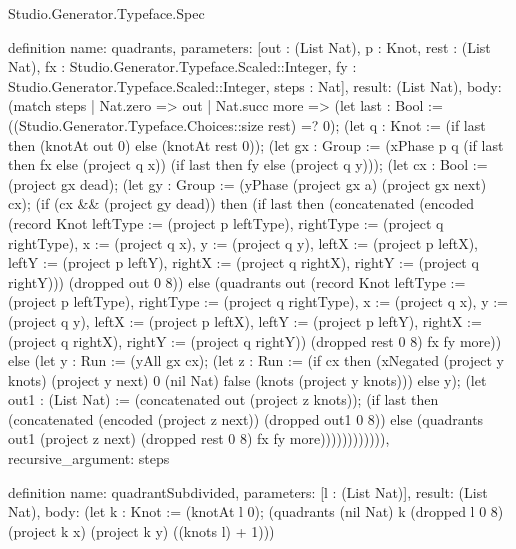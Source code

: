 \begin{lexlean}{Studio.Generator.Typeface.Spec}
\begin{semanticmodule}
definition{
  name: quadrants,
  parameters: [out : (List Nat), p : Knot, rest : (List Nat), fx : Studio.Generator.Typeface.Scaled::Integer, fy : Studio.Generator.Typeface.Scaled::Integer, steps : Nat],
  result: (List Nat),
  body: (match steps
    | Nat.zero => out
    | Nat.succ more => (let last : Bool := ((Studio.Generator.Typeface.Choices::size rest) =? 0); (let q : Knot := (if last then (knotAt out 0) else (knotAt rest 0)); (let gx : Group := (xPhase p q (if last then fx else (project q x)) (if last then fy else (project q y))); (let cx : Bool := (project gx dead); (let gy : Group := (yPhase (project gx a) (project gx next) cx); (if (cx && (project gy dead)) then (if last then (concatenated (encoded (record Knot {leftType := (project p leftType), rightType := (project q rightType), x := (project q x), y := (project q y), leftX := (project p leftX), leftY := (project p leftY), rightX := (project q rightX), rightY := (project q rightY)})) (dropped out 0 8)) else (quadrants out (record Knot {leftType := (project p leftType), rightType := (project q rightType), x := (project q x), y := (project q y), leftX := (project p leftX), leftY := (project p leftY), rightX := (project q rightX), rightY := (project q rightY)}) (dropped rest 0 8) fx fy more)) else (let y : Run := (yAll gx cx); (let z : Run := (if cx then (xNegated (project y knots) (project y next) 0 (nil Nat) false (knots (project y knots))) else y); (let out1 : (List Nat) := (concatenated out (project z knots)); (if last then (concatenated (encoded (project z next)) (dropped out1 0 8)) else (quadrants out1 (project z next) (dropped rest 0 8) fx fy more)))))))))))),
  recursive_argument: steps
}

definition{
  name: quadrantSubdivided,
  parameters: [l : (List Nat)],
  result: (List Nat),
  body: (let k : Knot := (knotAt l 0); (quadrants (nil Nat) k (dropped l 0 8) (project k x) (project k y) ((knots l) + 1)))
}


\end{semanticmodule}
\end{lexlean}
